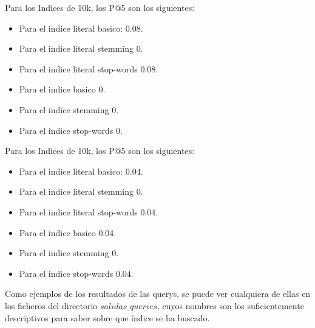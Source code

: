 \documentclass[palatino,nochap]{apuntes}
\begin{document}
Para los Indices de 10k, los P@5 son los siguientes:
\begin{itemize}
	\item Para el indice literal basico: $0.08$.
	\item Para el indice literal stemming $0$.
	\item Para el indice literal stop-words $0.08$.
	\item Para el indice basico $0$.
	\item Para el indice stemming $0$.
	\item Para el indice stop-words $0$.
\end{itemize}


Para los Indices de 10k, los P@5 son los siguientes:
\begin{itemize}
	\item Para el indice literal basico: $0.04$.
	\item Para el indice literal stemming $0$.
	\item Para el indice literal stop-words $0.04$.
	\item Para el indice basico $0.04$.
	\item Para el indice stemming $0$.
	\item Para el indice stop-words $0.04$.
\end{itemize}


Como ejemplos de los resultados de las querys, se puede ver cualquiera de ellas en los ficheros del directorio $salidas\_queries$, cuyos nombres son los suficientemente descriptivos para saber sobre que índice se ha buscado.
\end{document}
